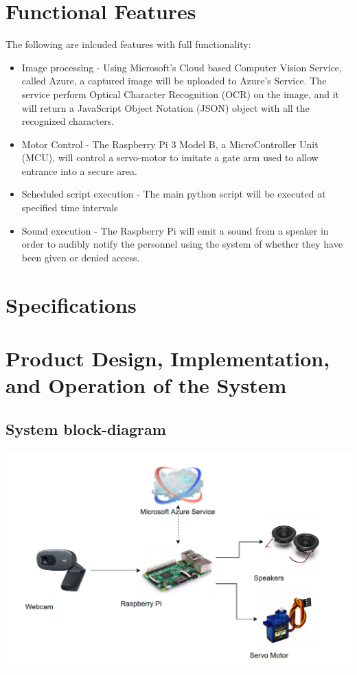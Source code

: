 \documentclass[a4paper,12pt]{article}
\begin{document}
\section{Functional Features}
The following are inlcuded features with full functionality:
\begin{itemize}
    \item Image processing - Using Microsoft's Cloud based Computer Vision Service, called Azure, a captured image will be uploaded to Azure's Service. The service perform Optical Character Recognition (OCR) on the image, and it will return a JavaScript Object Notation (JSON) object with all the recognized characters.
    \item Motor Control - The Raspberry Pi 3 Model B, a MicroController Unit (MCU), will control a servo-motor to imitate a gate arm used to allow entrance into a secure area.
    \item Scheduled script execution - The main python script will be executed at specified time intervals
    \item Sound execution - The Raspberry Pi will emit a sound from a speaker in order to audibly notify the personnel using the system of whether they have been given or denied access.
\end{itemize}

\newpage
\section{Specifications}
\section{Product Design, Implementation, and Operation of the System}
\subsection{System block-diagram}
\includegraphics[width = \linewidth]{../images/BlockDiagram.png}
\end{document}
